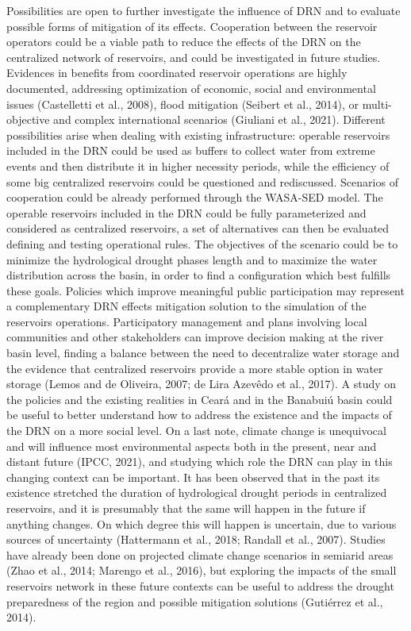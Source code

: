 \documentclass[draft]{agujournal2019}
\begin{document}
Possibilities are open to further investigate the influence of DRN and to evaluate possible forms of mitigation of its effects. Cooperation between the reservoir operators could be a viable path to reduce the effects of the DRN on the centralized network of reservoirs, and could be investigated in future studies. Evidences in benefits from coordinated reservoir operations are highly documented, addressing optimization of economic, social and environmental issues (Castelletti et al., 2008), flood mitigation (Seibert et al., 2014), or multi-objective and complex international scenarios (Giuliani et al., 2021). Different possibilities arise when dealing with existing infrastructure: operable reservoirs included in the DRN could be used as buffers to collect water from extreme events and then distribute it in higher necessity periods, while the efficiency of some big centralized reservoirs could be questioned and rediscussed. Scenarios of cooperation could be already performed through the WASA-SED model. The operable reservoirs included in the DRN could be fully parameterized and considered as centralized reservoirs, a set of alternatives can then be evaluated defining and testing operational rules. The objectives of the scenario could be to minimize the hydrological drought phases length and to maximize the water distribution across the basin, in order to find a configuration which best fulfills these goals. Policies which improve meaningful public participation may represent a complementary DRN effects mitigation solution to the simulation of the reservoirs operations. Participatory management and plans involving local communities and other stakeholders can improve decision making at the river basin level, finding a balance between the need to decentralize water storage and the evidence that centralized reservoirs provide a more stable option in water storage (Lemos and de Oliveira, 2007; de Lira Azevêdo et al., 2017). A study on the policies and the existing realities in Ceará and in the Banabuiú basin could be useful to better understand how to address the existence and the impacts of the DRN on a more social level. On a last note, climate change is unequivocal and will influence most environmental aspects both in the present, near and distant future (IPCC, 2021), and studying which role the DRN can play in this changing context can be important. It has been observed that in the past its existence stretched the duration of hydrological drought periods in centralized reservoirs, and it is presumably that the same will happen in the future if anything changes. On which degree this will happen is uncertain, due to various sources of uncertainty (Hattermann et al., 2018; Randall et al., 2007). Studies have already been done on projected climate change scenarios in semiarid areas (Zhao et al., 2014; Marengo et al., 2016), but exploring the impacts of the small reservoirs network in these future contexts can be useful to address the drought preparedness of the region and possible mitigation solutions (Gutiérrez et al., 2014).
\end{document}
